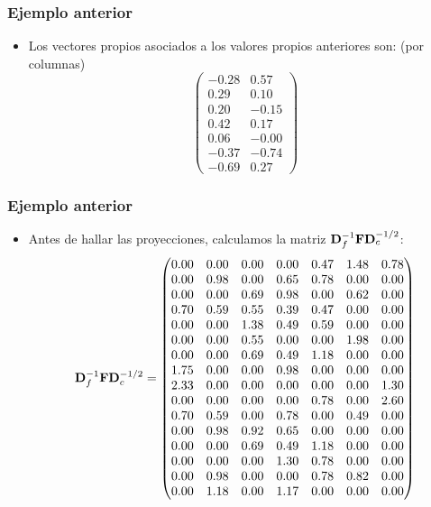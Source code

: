 \begin{frame}
\frametitle{Ejemplo anterior}
\begin{itemize}
\item<2->{Los vectores propios asociados a los valores propios anteriores son: (por columnas)
$$
\begin{pmatrix}
-0.28 & 0.57 \\
0.29 & 0.10 \\
0.20 & -0.15 \\
0.42 & 0.17 \\
0.06 & -0.00 \\
-0.37 & -0.74 \\
-0.69 & 0.27 
\end{pmatrix}
$$}
\end{itemize}
\end{frame}
\begin{frame}
\frametitle{Ejemplo anterior}
\begin{itemize}
\item<2->{Antes de hallar las proyecciones, calculamos la matriz $\mathbf{D}_f^{-1}\mathbf{F}\mathbf{D}_c^{-1/2}$:
{\tiny $$\mathbf{D}_f^{-1}\mathbf{F}\mathbf{D}_c^{-1/2}= 
\begin{pmatrix}
0.00 & 0.00 & 0.00 & 0.00 & 0.47 & 1.48 & 0.78 \\
0.00 & 0.98 & 0.00 & 0.65 & 0.78 & 0.00 & 0.00 \\
0.00 & 0.00 & 0.69 & 0.98 & 0.00 & 0.62 & 0.00 \\
0.70 & 0.59 & 0.55 & 0.39 & 0.47 & 0.00 & 0.00 \\
0.00 & 0.00 & 1.38 & 0.49 & 0.59 & 0.00 & 0.00 \\
0.00 & 0.00 & 0.55 & 0.00 & 0.00 & 1.98 & 0.00 \\
0.00 & 0.00 & 0.69 & 0.49 & 1.18 & 0.00 & 0.00 \\
1.75 & 0.00 & 0.00 & 0.98 & 0.00 & 0.00 & 0.00 \\
2.33 & 0.00 & 0.00 & 0.00 & 0.00 & 0.00 & 1.30 \\
0.00 & 0.00 & 0.00 & 0.00 & 0.78 & 0.00 & 2.60 \\
0.70 & 0.59 & 0.00 & 0.78 & 0.00 & 0.49 & 0.00 \\
0.00 & 0.98 & 0.92 & 0.65 & 0.00 & 0.00 & 0.00 \\
0.00 & 0.00 & 0.69 & 0.49 & 1.18 & 0.00 & 0.00 \\
0.00 & 0.00 & 0.00 & 1.30 & 0.78 & 0.00 & 0.00 \\
0.00 & 0.98 & 0.00 & 0.00 & 0.78 & 0.82 & 0.00 \\
0.00 & 1.18 & 0.00 & 1.17 & 0.00 & 0.00 & 0.00 
\end{pmatrix}
$$}}
\end{itemize}
\end{frame}

